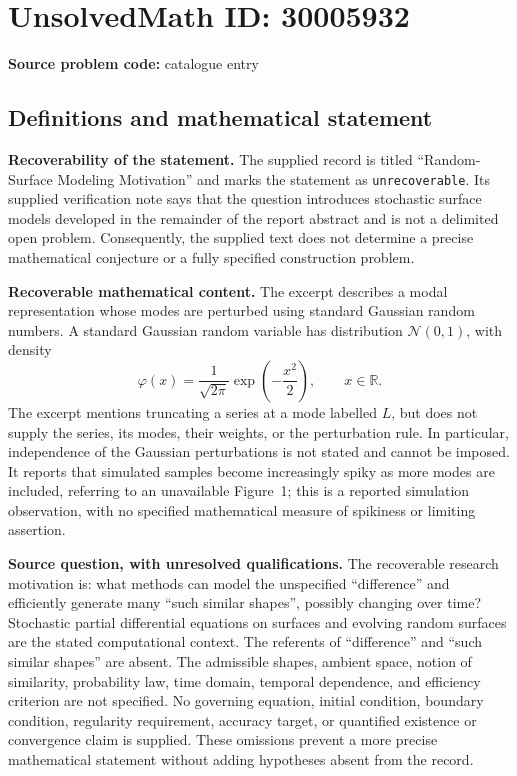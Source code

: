\documentclass[11pt]{article}
\newcommand{\R}{\mathbb{R}}
\begin{document}
\section*{UnsolvedMath ID: 30005932}
\textbf{Source problem code:} catalogue entry
\subsection{Definitions and mathematical statement}
\textbf{Recoverability of the statement.} The supplied record is titled ``Random-Surface Modeling Motivation'' and marks the statement as \texttt{unrecoverable}. Its supplied verification note says that the question introduces stochastic surface models developed in the remainder of the report abstract and is not a delimited open problem. Consequently, the supplied text does not determine a precise mathematical conjecture or a fully specified construction problem.

\textbf{Recoverable mathematical content.} The excerpt describes a modal representation whose modes are perturbed using standard Gaussian random numbers. A standard Gaussian random variable has distribution \(\mathcal N(0,1)\), with density
\[
\varphi(x)=\frac{1}{\sqrt{2\pi}}\exp\!\left(-\frac{x^2}{2}\right),\qquad x\in\R.
\]
The excerpt mentions truncating a series at a mode labelled \(L\), but does not supply the series, its modes, their weights, or the perturbation rule. In particular, independence of the Gaussian perturbations is not stated and cannot be imposed. It reports that simulated samples become increasingly spiky as more modes are included, referring to an unavailable Figure~1; this is a reported simulation observation, with no specified mathematical measure of spikiness or limiting assertion.

\textbf{Source question, with unresolved qualifications.} The recoverable research motivation is: what methods can model the unspecified ``difference'' and efficiently generate many ``such similar shapes'', possibly changing over time? Stochastic partial differential equations on surfaces and evolving random surfaces are the stated computational context. The referents of ``difference'' and ``such similar shapes'' are absent. The admissible shapes, ambient space, notion of similarity, probability law, time domain, temporal dependence, and efficiency criterion are not specified. No governing equation, initial condition, boundary condition, regularity requirement, accuracy target, or quantified existence or convergence claim is supplied. These omissions prevent a more precise mathematical statement without adding hypotheses absent from the record.
\end{document}
